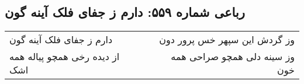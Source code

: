 \begin{center}
\section*{رباعی شماره ۵۵۹: دارم ز جفای فلک آینه گون}
\label{sec:sh559}
\begin{longtable}{l p{0.5cm} r}
دارم ز جفای فلک آینه گون
&&
وز گردش این سپهر خس پرور دون
\\
از دیده رخی همچو پیاله همه اشک
&&
وز سینه دلی همچو صراحی همه خون
\\
\end{longtable}
\end{center}

